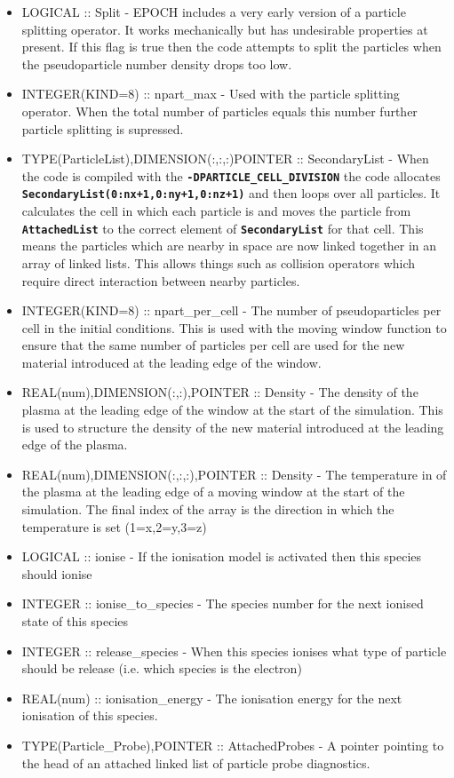 \documentclass[12pt]{article}
\newcommand{\inlinecode}[1]{{\color{warwickred} \bf\texttt{#1}}}
\newcommand{\nEPOCH}{{\color{warwickdark}\fontfamily{phv}\selectfont EPOCH}}
\newcommand{\EPOCH}{{\nEPOCH} }
\begin{document}
\begin{itemize}
\item LOGICAL :: Split - \EPOCH includes a very early version of a particle
  splitting operator. It works mechanically but has undesirable properties at
  present. If this flag is true then the code attempts to split the particles
  when the pseudoparticle number density drops too low.
\item INTEGER(KIND=8) :: npart\_max - Used with the particle splitting
  operator. When the total number of particles equals this number further
  particle splitting is supressed.
\item TYPE(ParticleList),DIMENSION(:,:,:)POINTER :: SecondaryList - When the
  code is compiled with the \inlinecode{-DPARTICLE\_CELL\_DIVISION} the code
  allocates \inlinecode{SecondaryList(0:nx+1,0:ny+1,0:nz+1)} and then loops
  over all particles. It calculates the cell in which each particle is and
  moves the particle from \inlinecode{AttachedList} to the correct element of
  \inlinecode{SecondaryList} for that cell. This means the particles which are
  nearby in space are now linked together in an array of linked lists. This
  allows things such as collision operators which require direct interaction
  between nearby particles.
\item INTEGER(KIND=8) :: npart\_per\_cell - The number of pseudoparticles per
  cell in the initial conditions. This is used with the moving window function
  to ensure that the same number of particles per cell are used for the new
  material introduced at the leading edge of the window.
\item REAL(num),DIMENSION(:,:),POINTER :: Density - The density of the plasma
  at the leading edge of the window at the start of the simulation. This is
  used to structure the density of the new material introduced at the leading
  edge of the plasma.
\item REAL(num),DIMENSION(:,:,:),POINTER :: Density - The temperature in of
  the plasma at the leading edge of a moving window at the start of the
  simulation. The final index of the array is the direction in which the
  temperature is set (1=x,2=y,3=z)
\item LOGICAL :: ionise - If the ionisation model is activated then this
  species should ionise
\item INTEGER :: ionise\_to\_species - The species number for the next ionised
  state of this species
\item INTEGER :: release\_species - When this species ionises what type of
  particle should be release (i.e. which species is the electron)
\item REAL(num) :: ionisation\_energy - The ionisation energy for the next
  ionisation of this species.
\item TYPE(Particle\_Probe),POINTER :: AttachedProbes - A pointer pointing to
  the head of an attached linked list of particle probe diagnostics.
\end{itemize}
\end{document}
